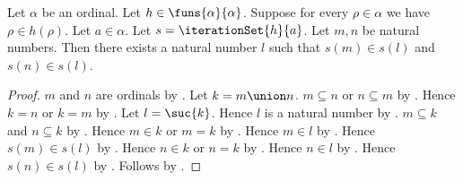 \begin{proposition}\label{strict_ordinal_iteration_common_stage}
    Let $\alpha$ be an ordinal.
    Let $h\in\funs{\alpha}{\alpha}$.
    Suppose for every $\rho\in\alpha$ we have $\rho\in h(\rho)$.
    Let $a\in\alpha$.
    Let $s=\iterationSet{h}{a}$.
    Let $m,n$ be natural numbers.
    Then there exists a natural number $l$ such that
        $s(m)\in s(l)$ and $s(n)\in s(l)$.
\end{proposition}
\begin{proof}
    $m$ and $n$ are ordinals by .
    Let $k=m\union n$.
    $m\subseteq n$ or $n\subseteq m$
        by .
    Hence $k=n$ or $k=m$
        by .
    Let $l=\suc{k}$.
    Hence $l$ is a natural number by .
    $m\subseteq k$ and $n\subseteq k$
        by .
    Hence $m\in k$ or $m=k$
        by .
    Hence $m\in l$ by .
    Hence $s(m)\in s(l)$
        by .
    Hence $n\in k$ or $n=k$
        by .
    Hence $n\in l$ by .
    Hence $s(n)\in s(l)$
        by .
    Follows by \auto.
\end{proof}

